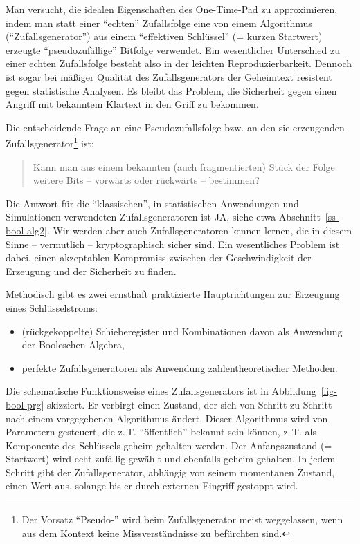 \begin{refsegment}
Man versucht, die idealen Eigenschaften des One-Time-Pad zu
approximieren, indem man statt einer "`echten"' Zufallsfolge eine
von einem Algorithmus ("`Zufallsgenerator"')
aus einem "`effektiven Schlüssel"' (= kurzen Startwert) erzeugte
"`pseudozufällige"' Bitfolge verwendet. Ein wesentlicher Unterschied
zu einer echten Zufallsfolge
besteht also in der leichten Reproduzierbarkeit.
Dennoch ist sogar bei mäßiger Qualität des Zufallsgenerators
der Geheimtext resistent gegen statistische
Analysen.
Es bleibt das Problem, die Sicherheit gegen einen Angriff mit
bekanntem Klartext
in den Griff zu bekommen.

Die entscheidende Frage an eine Pseudozufallsfolge
bzw. an den sie erzeugenden Zufallsgenerator\footnote{%
  Der Vorsatz "`Pseudo-"' wird beim Zufallsgenerator
  meist weggelassen,
  wenn aus dem Kontext keine Missverständnisse zu befürchten sind.
} ist:
\begin{quote}
   Kann man aus einem bekannten (auch fragmentierten) Stück
   der Folge weitere Bits -- vorwärts oder rückwärts -- bestimmen?
\end{quote}
Die Antwort für die "`klassischen"', in statistischen Anwendungen
und Simulationen verwendeten Zufallsgeneratoren ist JA, siehe
etwa Abschnitt~\ref{ss-bool-alg2}. Wir
werden aber auch Zufallsgeneratoren kennen lernen, die in diesem
Sinne -- vermutlich -- kryptographisch sicher sind. Ein wesentliches
Problem ist dabei, einen akzeptablen Kompromiss zwischen der
Geschwindigkeit der Erzeugung und der Sicherheit zu finden.

Methodisch gibt es zwei ernsthaft praktizierte Hauptrichtungen zur Erzeugung
eines Schlüsselstroms:
\begin{itemize}
\item (rückgekoppelte) Schieberegister und Kombinationen
      davon als Anwendung der Booleschen Algebra,
\item perfekte Zufallsgeneratoren als Anwendung zahlentheoretischer
      Methoden.
\end{itemize}

Die schematische Funktionsweise eines Zufallsgenerators ist in
Abbildung~\ref{fig-bool-prg} skizziert. Er verbirgt einen Zustand,
der sich von Schritt zu Schritt nach einem vorgegebenen Algorithmus
ändert. Dieser Algorithmus wird von Parametern gesteuert, die z.\,T.
"`öffentlich"' bekannt sein können, z.\,T. als Komponente des Schlüssels
geheim gehalten werden. Der Anfangszustand (= Startwert) wird echt
zufällig gewählt und ebenfalls geheim gehalten. In jedem Schritt gibt
der Zufallsgenerator, abhängig von
seinem momentanen Zustand, einen Wert aus,
solange bis er durch externen Eingriff gestoppt wird.


\end{refsegment}

